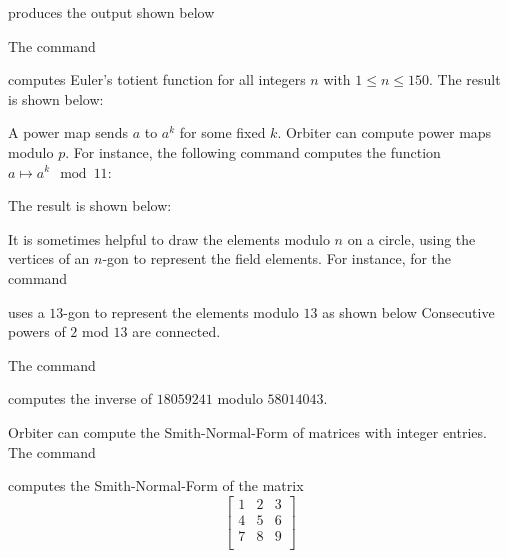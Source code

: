 
produces the output shown below 



\bigskip


The command 


computes Euler's totient function for all integers $n$ with $1 \le n \le 150.$
The result is shown below:



\bigskip

A power map sends $a$ to $a^k$ for some fixed $k$. 
Orbiter can compute power maps modulo $p$. 
For instance, the following command 
computes the function $a \mapsto a^k \mod 11$:


The result is shown below:


\bigskip

It is sometimes helpful to draw the elements modulo $n$ on a circle, 
using the vertices of an $n$-gon to represent the field elements. 
For instance, for the command 


uses a $13$-gon to represent the elements modulo $13$ as shown below
Consecutive powers of $2$ mod $13$ are connected.

\bigskip


The command 


computes the inverse of $18059241$ modulo $58014043$.

\bigskip



Orbiter can compute the Smith-Normal-Form of matrices with integer entries.
The command 


computes the Smith-Normal-Form of the matrix 
$$
\left[
\begin{array}{ccc}
	1&2&3\\
	4&5&6\\
	7&8&9\\
\end{array}
\right]
$$



